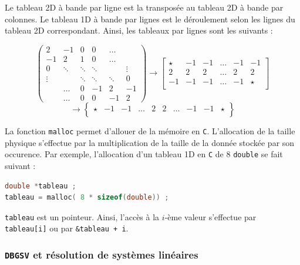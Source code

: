 \documentclass[12pt]{report}
\begin{document}
Le tableau 2D à bande par ligne est la transposée au tableau 2D à bande par colonnes. Le tableau 1D à bande par lignes est le déroulement selon les lignes du tableau 2D correspondant. Ainsi, les tableaux par lignes sont les suivants : 

\begin{equation}
\begin{pmatrix}
2 & -1& 0 & 0 & \hdots&  \\
-1 & 2 &  1 & 0 & \hdots  &  \\
0&  \ddots&\ddots &\ddots && \vdots\\
\vdots& & \ddots&\ddots &\ddots &0 \\
&\hdots &0 & -1&2 & -1 \\
&\hdots &0 &0 &-1 & 2
\end{pmatrix} \longrightarrow 
\begin{bmatrix}
\star & -1 & -1  & \hdots & -1 & -1  \\
2 & 2 & 2  & \hdots & 2 & 2  \\
-1 & -1 & -1  & \hdots & -1 & \star  \\
\end{bmatrix}
\end{equation}
\begin{equation*}
\longrightarrow 
\begin{Bmatrix}
\star & -1 & -1  & \hdots &  2 & 2   & \hdots & -1  & -1 & \star \\
\end{Bmatrix}
\end{equation*}

La fonction \texttt{malloc} permet d'allouer de la mémoire en \texttt{C}. L'allocation de la taille physique s'effectue par la multiplication de la taille de la donnée stockée par son occurence. Par exemple, l'allocation d'un tableau 1D en \texttt{C} de 8 \texttt{double} se fait suivant : 

\begin{lstlisting}[language=C, caption=Allocation tableau 1D]
double *tableau ; 
tableau = malloc( 8 * sizeof(double)) ; 
\end{lstlisting}

\texttt{tableau} est un pointeur. Ainsi, l'accès à la $i$-ème valeur s'effectue par \texttt{tableau[i]} ou par \texttt{\&tableau + i}.

\subsubsection{\texttt{DBGSV} et résolution de systèmes linéaires}
\end{document}
